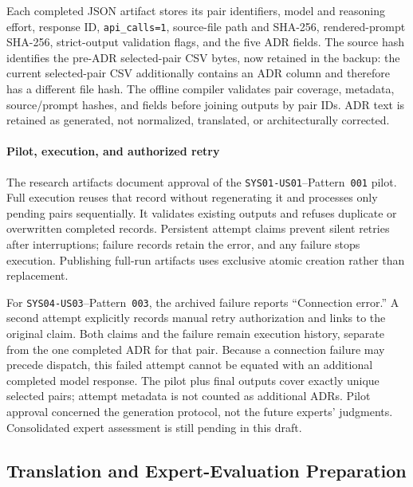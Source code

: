 Each completed JSON artifact stores its pair identifiers, model and reasoning
effort, response ID, \texttt{api\_calls=1}, source-file path and SHA-256,
rendered-prompt SHA-256, strict-output validation flags, and the five ADR
fields. The source hash identifies the pre-ADR selected-pair CSV bytes,
now retained in the backup: the current selected-pair CSV additionally
contains an ADR column and therefore has a different file hash.
The offline compiler validates pair coverage, metadata, source/prompt hashes,
and fields before joining outputs by pair IDs. ADR text is retained as
generated, not normalized, translated, or architecturally corrected.

\paragraph{Pilot, execution, and authorized retry}
The research artifacts document approval of the
\texttt{SYS01-US01}--Pattern~\texttt{001} pilot. Full execution reuses that
record without regenerating it and processes only pending pairs sequentially.
It validates existing outputs and refuses duplicate or overwritten completed
records. Persistent attempt claims prevent silent retries after interruptions;
failure records retain the error, and any failure stops execution.
Publishing full-run artifacts uses exclusive atomic creation rather than
replacement.

For \texttt{SYS04-US03}--Pattern~\texttt{003}, the archived failure reports
``Connection error.'' A second attempt explicitly records manual retry
authorization and links to the original claim. Both claims and the failure
remain execution history, separate from the one completed ADR for that pair.
Because a connection failure may precede dispatch, this failed attempt cannot
be equated with an additional completed model response. The pilot plus final
outputs cover exactly \StudyAdrCount{} unique selected pairs; attempt
metadata is not counted as additional ADRs. Pilot approval concerned the
generation protocol, not the future experts' judgments. Consolidated expert
assessment is still pending in this draft.


\subsection{Translation and Expert-Evaluation Preparation}
\label{sec:expert-preparation}

